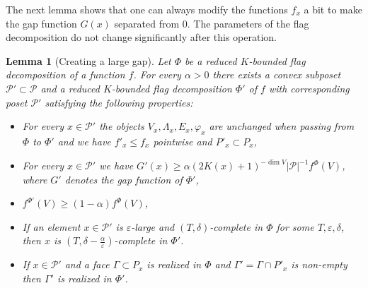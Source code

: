 \documentclass{daj}
\renewcommand{\le}{\leqslant}
\renewcommand{\ge}{\geqslant}
\renewcommand{\P}{\mathcal P}
\newtheorem{lemma}[theorem]{Lemma}
\theoremstyle{definition}
\theoremstyle{remark}
\theoremstyle{definition}
\theoremstyle{definition}
\begin{document}
The next lemma shows that one can always modify the functions $f_x$ a bit to make the gap function $G(x)$ separated from 0. The parameters of the flag decomposition do not change significantly after this operation. 

\begin{lemma}[Creating a large gap]\label{completion}
Let $\Phi$ be a reduced $K$-bounded flag decomposition of a function $f$. For every $\alpha > 0$ there exists a convex subposet $\P' \subset \P$ and a reduced $K$-bounded flag decomposition $\Phi'$ of $f$ with corresponding poset $\P'$ satisfying the following properties:
\begin{itemize}
    \item For every $x \in \P'$ the objects $V_x, \Lambda_x, E_x, \varphi_x$ are unchanged when passing from $\Phi$ to $\Phi'$ and we have $f'_x \le f_x$ pointwise and $P'_x \subset P_x$,
    \item For every $x \in \P'$ we have $G'(x) \ge \alpha (2 K(x)+1)^{-\dim V} |\P|^{-1} f^{\Phi}(V)$, where $G'$ denotes the gap function of $\Phi'$,
    \item $f^{\Phi'}(V) \ge (1-\alpha) f^\Phi(V)$,
    \item If an element $x \in \P'$ is $\varepsilon$-large and $(T, \delta)$-complete in $\Phi$ for some $T, \varepsilon, \delta$, then $x$ is $(T, \delta - \frac{\alpha}{\varepsilon})$-complete in $\Phi'$. 
    \item If $x \in \P'$ and a face $\Gamma \subset P_x$ is realized in $\Phi$ and $\Gamma' = \Gamma \cap P'_x$ is non-empty then $\Gamma'$ is realized in $\Phi'$.
\end{itemize}

\end{lemma}
\end{document}
